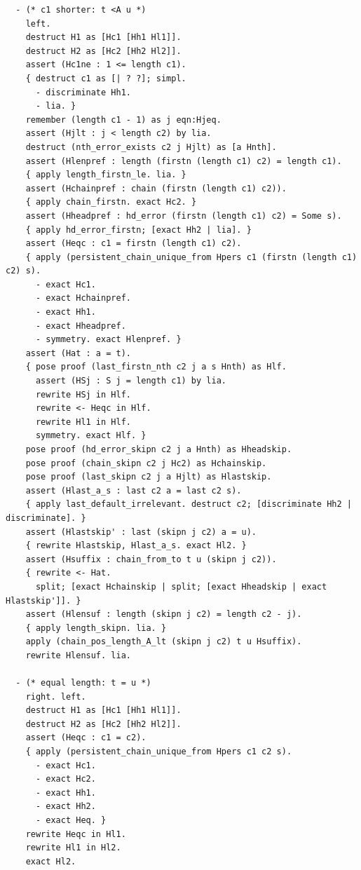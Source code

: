 \begin{latin}
\begin{verbatim}
  - (* c1 shorter: t <A u *)
    left.
    destruct H1 as [Hc1 [Hh1 Hl1]].
    destruct H2 as [Hc2 [Hh2 Hl2]].
    assert (Hc1ne : 1 <= length c1).
    { destruct c1 as [| ? ?]; simpl.
      - discriminate Hh1.
      - lia. }
    remember (length c1 - 1) as j eqn:Hjeq.
    assert (Hjlt : j < length c2) by lia.
    destruct (nth_error_exists c2 j Hjlt) as [a Hnth].
    assert (Hlenpref : length (firstn (length c1) c2) = length c1).
    { apply length_firstn_le. lia. }
    assert (Hchainpref : chain (firstn (length c1) c2)).
    { apply chain_firstn. exact Hc2. }
    assert (Hheadpref : hd_error (firstn (length c1) c2) = Some s).
    { apply hd_error_firstn; [exact Hh2 | lia]. }
    assert (Heqc : c1 = firstn (length c1) c2).
    { apply (persistent_chain_unique_from Hpers c1 (firstn (length c1) c2) s).
      - exact Hc1.
      - exact Hchainpref.
      - exact Hh1.
      - exact Hheadpref.
      - symmetry. exact Hlenpref. }
    assert (Hat : a = t).
    { pose proof (last_firstn_nth c2 j a s Hnth) as Hlf.
      assert (HSj : S j = length c1) by lia.
      rewrite HSj in Hlf.
      rewrite <- Heqc in Hlf.
      rewrite Hl1 in Hlf.
      symmetry. exact Hlf. }
    pose proof (hd_error_skipn c2 j a Hnth) as Hheadskip.
    pose proof (chain_skipn c2 j Hc2) as Hchainskip.
    pose proof (last_skipn c2 j a Hjlt) as Hlastskip.
    assert (Hlast_a_s : last c2 a = last c2 s).
    { apply last_default_irrelevant. destruct c2; [discriminate Hh2 | discriminate]. }
    assert (Hlastskip' : last (skipn j c2) a = u).
    { rewrite Hlastskip, Hlast_a_s. exact Hl2. }
    assert (Hsuffix : chain_from_to t u (skipn j c2)).
    { rewrite <- Hat.
      split; [exact Hchainskip | split; [exact Hheadskip | exact Hlastskip']]. }
    assert (Hlensuf : length (skipn j c2) = length c2 - j).
    { apply length_skipn. lia. }
    apply (chain_pos_length_A_lt (skipn j c2) t u Hsuffix).
    rewrite Hlensuf. lia.

  - (* equal length: t = u *)
    right. left.
    destruct H1 as [Hc1 [Hh1 Hl1]].
    destruct H2 as [Hc2 [Hh2 Hl2]].
    assert (Heqc : c1 = c2).
    { apply (persistent_chain_unique_from Hpers c1 c2 s).
      - exact Hc1.
      - exact Hc2.
      - exact Hh1.
      - exact Hh2.
      - exact Heq. }
    rewrite Heqc in Hl1.
    rewrite Hl1 in Hl2.
    exact Hl2.


\end{verbatim}
\end{latin}
